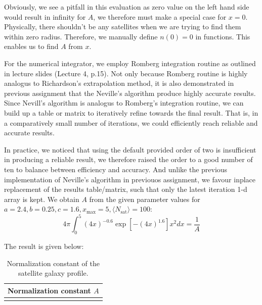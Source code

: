\documentclass{article}
\begin{document}
    Obviously, we see a pitfall in this evaluation as zero value on the left hand side 
    would result in infinity for $A$, we therefore must make a special case for $x=0$.
    Physically, there shouldn't be any satellites when we are trying to find them within 
    zero radius. Therefore, we manually define $n(0) = 0$ in functions. This enables us 
    to find $A$ from $x$.

    For the numerical integrator, we employ Romberg integration routine as outlined in 
    lecture slides (Lecture 4, p.15). Not only because Romberg routine is highly 
    analogus to Richardson's extrapolation method, it is also demonstrated in previous 
    assignment that the Neville's algorithm produce highly accurate results. Since 
    Nevill's algorithm is analogus to Romberg's integration routine, we can build up
    a table or matrix to iteratively refine towards the final result. That is, in a 
    comparatively small number of iterations, we could efficiently reach reliable and 
    accurate results. 
    
    In practice, we noticed that using the default provided order of two is insufficient 
    in producing a reliable result, we therefore raised the order to a good number of 
    ten to balance between efficiency and accuracy. And unlike the previous 
    implementation of Neville's algorithm in previouos assignment, we favour inplace 
    replacement of the results table/matrix, such that only the latest iteration 1-d 
    array is kept. We obtain $A$ from the given parameter values for 
    $a=2.4, b=0.25, c=1.6, x_\text{max}=5, \langle N_\text{sat} \rangle=100$:
    \begin{equation}
      4 \pi \int_{0}^{5} (4x)^{-0.6} 
      \exp{\left[-(4x)^{1.6}\right]} x^2 dx 
      = \frac{1}{A}
    \end{equation}

    The result is given below:

    \begin{table}[H]
    \centering
      \begin{tabular}{|c|}
        \hline
        Normalization constant \(A\) \\
        \hline
         \\
        \hline
      \end{tabular}
      \caption{Normalization constant of the satellite galaxy profile.}
    \end{table}

\end{document}
